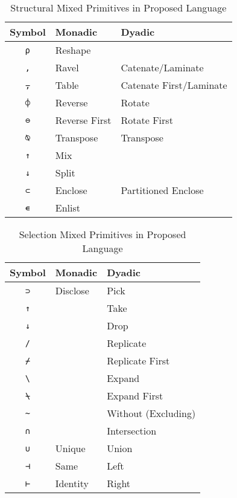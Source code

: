 \documentclass[numbers,preprint]{sigplanconf}
\begin{document}
\begin{table}
\centering
\begin{tabular}{cll}
\toprule
Symbol     & Monadic       & Dyadic \\
\midrule
\texttt{⍴} & Reshape       & \\
\texttt{,} & Ravel         & Catenate/Laminate \\
\texttt{⍪} & Table         & Catenate First/Laminate \\
\texttt{⌽} & Reverse       & Rotate \\
\texttt{⊖} & Reverse First & Rotate First \\
\texttt{⍉} & Transpose     & Transpose \\
\texttt{↑} & Mix           & \\
\texttt{↓} & Split         & \\
\texttt{⊂} & Enclose       & Partitioned Enclose \\
\texttt{∊} & Enlist        & \\
\end{tabular}
\caption{Structural Mixed Primitives in Proposed Language}
\label{tab:structprims}
\end{table}

\begin{table}
\centering
\begin{tabular}{cll}
\toprule
Symbol                   & Monadic  & Dyadic \\
\midrule
\texttt{⊃}               & Disclose & Pick\\
\texttt{↑}               &          & Take \\
\texttt{↓}               &          & Drop \\
\texttt{/}               &          & Replicate \\
\texttt{⌿}               &          & Replicate First \\
\texttt{\textbackslash}  &          & Expand \\
\texttt{⍀}               &          & Expand First \\
\texttt{\textasciitilde} &          & Without (Excluding) \\
\texttt{∩}               &          & Intersection \\
\texttt{∪}               & Unique   & Union \\
\texttt{⊣}               & Same     & Left \\
\texttt{⊢}               & Identity & Right\\
\end{tabular}
\caption{Selection Mixed Primitives in Proposed Language}
\label{tab:selprims}
\end{table}
\end{document}
